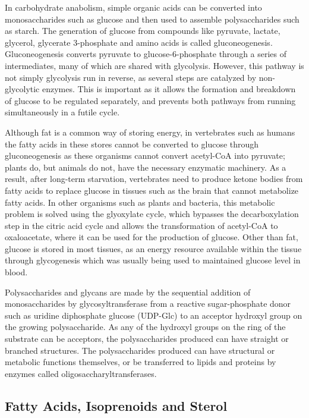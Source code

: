 In carbohydrate anabolism, simple organic acids can be converted into monosaccharides such as glucose and then used to assemble polysaccharides such as starch. The generation of glucose from compounds like pyruvate, lactate, glycerol, glycerate 3-phosphate and amino acids is called gluconeogenesis. Gluconeogenesis converts pyruvate to glucose-6-phosphate through a series of intermediates, many of which are shared with glycolysis. However, this pathway is not simply glycolysis run in reverse, as several steps are catalyzed by non-glycolytic enzymes. This is important as it allows the formation and breakdown of glucose to be regulated separately, and prevents both pathways from running simultaneously in a futile cycle.

Although fat is a common way of storing energy, in vertebrates such as humans the fatty acids in these stores cannot be converted to glucose through gluconeogenesis as these organisms cannot convert acetyl-CoA into pyruvate; plants do, but animals do not, have the necessary enzymatic machinery. As a result, after long-term starvation, vertebrates need to produce ketone bodies from fatty acids to replace glucose in tissues such as the brain that cannot metabolize fatty acids. In other organisms such as plants and bacteria, this metabolic problem is solved using the glyoxylate cycle, which bypasses the decarboxylation step in the citric acid cycle and allows the transformation of acetyl-CoA to oxaloacetate, where it can be used for the production of glucose. Other than fat, glucose is stored in most tissues, as an energy resource available within the tissue through glycogenesis which was usually being used to maintained glucose level in blood.

Polysaccharides and glycans are made by the sequential addition of monosaccharides by glycosyltransferase from a reactive sugar-phosphate donor such as uridine diphosphate glucose (UDP-Glc) to an acceptor hydroxyl group on the growing polysaccharide. As any of the hydroxyl groups on the ring of the substrate can be acceptors, the polysaccharides produced can have straight or branched structures. The polysaccharides produced can have structural or metabolic functions themselves, or be transferred to lipids and proteins by enzymes called oligosaccharyltransferases.

\hypertarget{fatty-acids-isoprenoids-and-sterol}{%
\subsection{Fatty Acids, Isoprenoids and Sterol}\label{fatty-acids-isoprenoids-and-sterol}}

